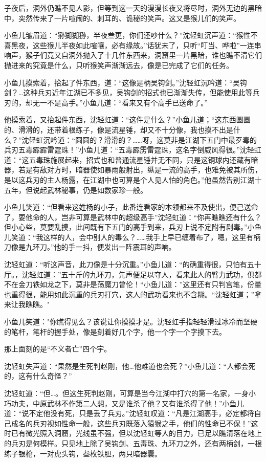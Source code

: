 \documentclass[12pt,oneside]{book}
\begin{document}
子夜后，洞外仍瞧不见人影，但等到这一天的漫漫长夜又将尽时，洞外无边的黑暗中，突然传来了一片喧闹的、刺耳的、诡秘的笑声。这又是猴儿们的笑声。

小鱼儿皱眉道：``狲猢猢狲，半夜叁更，你们还吵什么？''沈轻虹沉声道：``猴性不喜黑夜，这些猴儿半夜如此喧嚷，必有缘故。''话犹未了，只听``叮当、哗啦''一连串响声，猴子们竟又自洞外抛入了十几件东西来，洞窟里一片黑暗，谁也瞧不清它们抛进来的究竟是什么，只听猴笑声渐渐远去，像是已完成了它们的任务。

小鱼儿摸索着，拾起了件东西，道：``这像是柄吴钩剑。''沈轻虹沉吟道：``吴钩剑？\ldots 这种兵刃近年江湖已不多见，吴钩剑的招式也已渐渐失传，但能使用此等兵刃的，却无一不是高手。''小鱼儿道：``看来又有个高手已送命了。''

他摸索着，又抬起件东西，沈轻虹道：``这件是什么？''小鱼儿道；``这东西圆圆的、滑滑的，还带着根练子，像是流星锤，却又不十分像，我也摸不出是什么？''沈轻虹沉吟道：``圆圆的？滑滑的？\ldots\ldots 呀，这莫非是江湖下五门中最歹毒的兵刃五毒霹霹雷霆珠！''小鱼儿道：``五毒霹雳雷霆珠，这名字倒威风得很。''沈轻虹道：``这五毒珠施展起来，招式也和普通流星锤并无不同，只是这铜球内还藏有暗器，若是有敌对方时，暗器使如暴雨般射出，纵是一流的高手，也难免被其所伤，是以这兵刃的主人杨露，在江湖中也可算是个人见人怕的角色。''他虽然告别江湖十五年，但说起武林秘事，仍是如数家珍一般。

小鱼儿笑道：``但看来这姓杨的小子，此番连看家的本领都来不及使出，便己送命了，要他命的人，岂非可算是武林中的超级高手''沈轻虹道：``你再瞧瞧还有什么？但小心些，莫要乱摸，此间既有下五门的高手到来，兵刃上说不定附有剧毒。''小鱼儿笑道：``我这样的人，会中别人的毒么？\ldots\ldots 我手上早已缠着布了，嗯，这里有柄刀像是九环刀。''他的手一抖，便发出一阵震耳的声响。

沈轻虹道：``听这声音，此刀像是十分沉重。''小鱼儿道：``的确重得很，只怕有五十厅。，沈轻虹道：''五十斤的九环刀，先声便足以夺人，看来此人的臂力武功，俱都不在金刀铁如龙之下，莫非是荡魔刀曾伦！``小鱼儿道：''这里还有只判宫笔，份量也重得很，能用如此沉重的兵刃打穴，这人的武功看来也不含糊。``沈轻虹道；''拿来让我瞧瞧。"

小鱼儿笑道："你瞧得见么？该说让你摸摸才是。沈轻虹手指轻轻滑过冰冷而坚硬的笔杆，笔杆的握手处，像是刻着好几个字，他一个字一个字摸下去。

那上面刻的是``不义者亡''四个宇。

沈轻虹失声道：``果然是生死判赵刚，他\ldots 他难道也会死？''小鱼儿道：``人都会死的，这有什么奇怪？''

沈轻虹道：``但\ldots。但这生死判赵刚，可算是当今江湖中打穴的第一名家，一身小巧功夫，中原武林不作第二人想，又是谁杀了他？又有谁杀得了他！''小鱼儿道：``说不定他没有死，只是丢了兵刃。''沈轻虹叹道：``凡是江湖高手，必定都将自己成名的兵刃视如性命一般，这些兵刃既落入猿猴之手，他们的性命已不保！''这时已有微光照入洞窟，光线虽不强，但以沈轻虹等人的目力，已足以瞧清落在地上的兵刃是何模样。只见地上除了吴钩剑、五毒珠、九环刀之外，还有两柄剑，一根练子银枪，一对虎头钩，叁枚铁胆，两只暗器囊。
\end{document}
